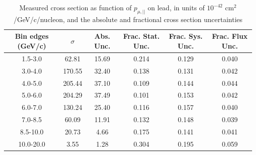 \documentclass[../main.tex]{subfiles}
\begin{document}
\pagebreak
\begin{turnpage}
\end{turnpage}
\begin{table}
  \centering
  \renewcommand{\arraystretch}{1.15}
  \caption{Measured cross section as function of $p_{\mu,||}$ on lead, in units of $10^{-42}$ $\text{cm}^2$/GeV/c/nucleon, and the absolute and fractional cross section uncertainties}
    \begin{tabular}{c||c|c||c|c|c}
      Bin edges (GeV/c) &  $\sigma$  &  Abs. Unc.  &  Frac. Stat. Unc.  &  Frac. Sys. Unc.  &  Frac. Flux Unc. \\
      \hline
      \hline
      1.5-3.0 & 62.81 & 15.69 & 0.214 & 0.129 & 0.040\\
      3.0-4.0 & 170.55 & 32.40 & 0.138 & 0.131 & 0.042\\
      4.0-5.0 & 205.44 & 37.10 & 0.109 & 0.144 & 0.044\\
      5.0-6.0 & 204.29 & 37.49 & 0.101 & 0.153 & 0.042\\
      6.0-7.0 & 130.24 & 25.40 & 0.116 & 0.157 & 0.040\\
      7.0-8.5 & 60.09 & 11.91 & 0.132 & 0.148 & 0.039\\
      8.5-10.0 & 20.73 & 4.66 & 0.175 & 0.141 & 0.041\\
      10.0-20.0 & 3.55 & 1.28 & 0.304 & 0.195 & 0.059
    \end{tabular}
  \label{tbl:datanucleonnuc82muon_pza}
\end{table}
\begin{table}
  \centering
  \renewcommand{\arraystretch}{1.15}
  \caption{Statistical covariance matrix of measured cross section as function of $p_{\mu,||}$ on lead, in units of $10^{-84}$ $(\text{cm}^2$/GeV/c/nucleon$)^2$}
  \label{tbl:statnucleonnuc82muon_pzb}
\end{table}
\end{document}
